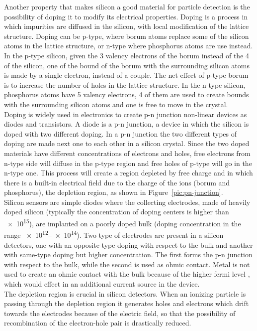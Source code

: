 Another property that makes silicon a good material for particle detection is the possibility of doping it to modify its electrical properties. Doping is a process in which impurities are diffused in the silicon, with local modification of the lattice structure. Doping can be p-type, where borum atoms replace some of the silicon atoms in the lattice structure, or n-type where phosphorus atoms are use instead. In the p-type silicon, given the 3 valency electrons of the borum instead of the 4 of the silicon, one of the bound of the borum with the surrounding silicon atoms is made by a single electron, instead of a couple. The net effect of p-type borum is to increase the number of holes in the lattice structure. In the n-type silicon, phosphorus atoms have 5 valency electrons, 4 of them are used to create bounds with the surrounding silicon atoms and one is free to move in the crystal.\\
Doping is widely used in electronics to create p-n junction non-linear devices as diodes and transistors. A diode is a p-n junction, a device in which the silicon is doped with two different doping. In a p-n junction the two different types of doping are made next one to each other in a silicon crystal. Since the two doped materials have different concentrations of electrons and holes, free electrons from n-type side will diffuse in the p-type region and free holes of p-type will go in the n-type one. This process will create a region depleted by free charge and in which there is a built-in electrical field due to the charge of the ions (borum and phosphorus), the depletion region, as shown in Figure~\ref{pic:pn-junction}.\\
Silicon sensors are simple diodes where the collecting electrodes, made of heavily doped silicon (typically the concentration of doping centers is higher than \SI{e15}{\per{\cubic{\centi\meter}}}), are implanted on a poorly doped bulk (doping concentration in the range \SIrange{e12}{e14}{\per{\cubic{\centi\meter}}}). Two type of electrodes are present in a silicon detectors, one with an opposite-type doping with respect to the bulk and another with same-type doping but higher concentration. The first forms the p-n junction with respect to the bulk, while the second is used as ohmic contact. Metal is not used to create an ohmic contact with the bulk because of the higher fermi level \cite{metal_semiconductor_juction}, which would effect in an additional current source in the device.\\
The depletion region is crucial in silicon detectors. When an ionizing particle is passing through the depletion region it generates holes and electrons which drift towards the electrodes because of the electric field, so that the possibility of recombination of the electron-hole pair is drastically reduced.
